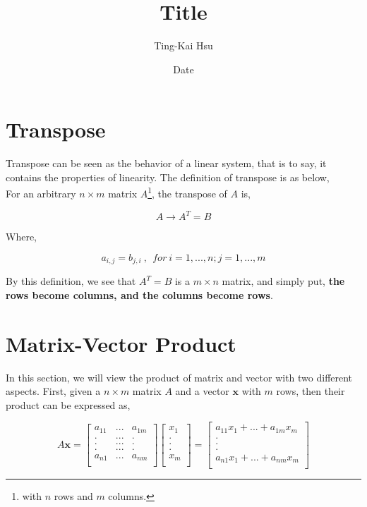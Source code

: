 \documentclass[12pt]{article}
\title{Title}
\author{Ting-Kai Hsu}
\date{Date}
\begin{document}
\section{Transpose}

Transpose can be seen as the behavior of a linear system, that is to say, it contains the properties of linearity. The definition of transpose is as below,
\\
\indent For an arbitrary $n \times m$ matrix $A$\footnote{with $n$ rows and $m$ columns.}, the transpose of $A$ is,

\begin{center}
    \[ A \longrightarrow A^T = B \]
\end{center}

Where,

\begin{center}
    \[ a_{i, j} = b_{j, i}\ ,\ \ for\ i = 1, ..., n; j = 1, ..., m \]
\end{center}

By this definition, we see that $A^T = B$ is a $m \times n$ matrix, and simply put, \textbf{the rows become columns, and the columns become rows}.

\section{Matrix-Vector Product}

In this section, we will view the product of matrix and vector with two different aspects. First, given a $n \times m$ matrix $A$ and a vector $\mathbf{x}$ with $m$ rows, then their product can be expressed as,

\begin{center}
    \[ A\mathbf{x} = \begin{bmatrix}
        a_{11} & ... & a_{1m}\\
        . & ... & .\\
        . & ... & .\\
        . & ... & .\\
        a_{n1} & ... & a_{nm}\\
    \end{bmatrix} \begin{bmatrix}
        x_1\\
        .\\
        .\\
        .\\
        x_m\\
    \end{bmatrix} = \begin{bmatrix}
        a_{11}x_{1} + ... + a_{1m}x_{m}\\
        .\\.\\.\\
        a_{n1}x_{1} + ... + a_{nm}x_{m}\\
    \end{bmatrix}\]
\end{center}
\end{document}
